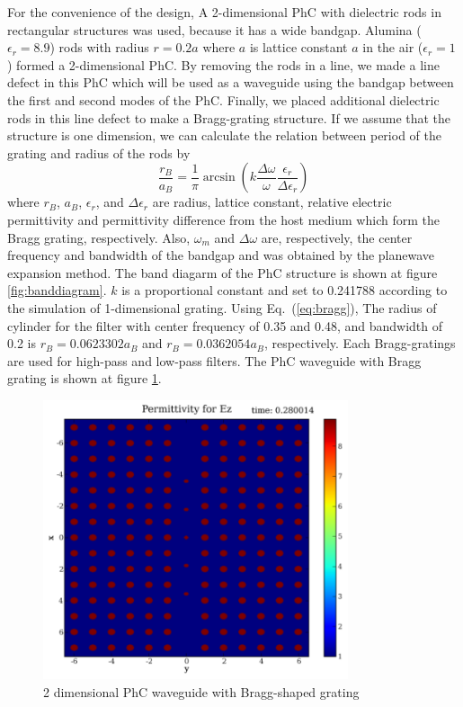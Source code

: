 For the convenience of the design, A 2-dimensional PhC with dielectric rods in rectangular structures was used, because it has a wide bandgap. Alumina ($\epsilon_r=8.9$) rods with radius $r=0.2a$ where $a$ is lattice constant $a$ in the air ($\epsilon_r=1$) formed a 2-dimensional PhC. By removing the rods in a line, we made a line defect in this PhC which will be used as a waveguide using the bandgap between the first and second modes of the PhC. Finally, we placed additional dielectric rods in this line defect to make a Bragg-grating structure. If we assume that the structure is one dimension, we can calculate the relation between period of the grating and radius of the rods by
\begin{equation}
\frac{r_B}{a_B} = \frac{1}{\pi} \arcsin \left( k \frac{\Delta \omega}{\omega} \frac{\epsilon_r}{\Delta \epsilon_r} \right)
\label{eq:bragg}
\end{equation}
where $r_B$, $a_B$, $\epsilon_r$, and $\Delta \epsilon_r$ are radius, lattice constant, relative electric permittivity and permittivity difference from the host medium which form the Bragg grating, respectively. Also, $\omega_m$ and $\Delta \omega$ are, respectively, the center frequency and bandwidth of the bandgap and was obtained by the planewave expansion method. The band diagarm of the PhC structure is shown at figure \ref{fig:banddiagram}. $k$ is a proportional constant and set to 0.241788 according to the simulation of 1-dimensional grating. Using Eq.~(\ref{eq:bragg}), The radius of cylinder for the filter with center frequency of 0.35 and 0.48, and bandwidth of 0.2 is $r_B=0.0623302a_B$ and $r_B=0.0362054a_B$, respectively. Each Bragg-gratings are used for high-pass and low-pass filters. The PhC waveguide with Bragg grating is shown at figure \ref{fig:phc_waveguide_view}.

\begin{figure}[hp!]
  \centering
  \includegraphics[width=0.8\textwidth]{figure/phc_waveguide_view}
  \caption{2 dimensional PhC waveguide with Bragg-shaped grating}
  \label{fig:phc_waveguide_view}
\end{figure}

